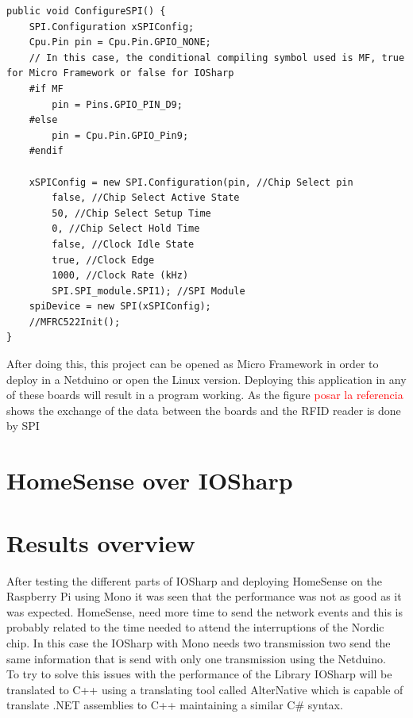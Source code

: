 \begin{lstlisting}[language=CSharp, caption={SPIApi.cs - Conditional compiling symbol for NETMF and IOSharp}]
public void ConfigureSPI() {
    SPI.Configuration xSPIConfig;
    Cpu.Pin pin = Cpu.Pin.GPIO_NONE;
  	// In this case, the conditional compiling symbol used is MF, true for Micro Framework or false for IOSharp
  	#if MF
    	pin = Pins.GPIO_PIN_D9;
    #else
        pin = Cpu.Pin.GPIO_Pin9;
    #endif

    xSPIConfig = new SPI.Configuration(pin, //Chip Select pin
        false, //Chip Select Active State
        50, //Chip Select Setup Time
        0, //Chip Select Hold Time
        false, //Clock Idle State
        true, //Clock Edge
        1000, //Clock Rate (kHz)
        SPI.SPI_module.SPI1); //SPI Module
    spiDevice = new SPI(xSPIConfig);
    //MFRC522Init();
}
\end{lstlisting}

After doing this, this project can be opened as Micro Framework in order to deploy in a Netduino or open the Linux version. Deploying this application in any of these boards will result in a program working. As the figure \textcolor{red}{posar la referencia} shows the exchange of the data between the boards and the RFID reader is done by SPI

\section{HomeSense over IOSharp}\label{S:HomeSense-IOSharp}

\section{Results overview}\label{S:Results-overview}
After testing the different parts of IOSharp and deploying HomeSense on the Raspberry Pi using Mono it was seen that the performance was not as good as it was expected. HomeSense, need more time to send the network events and this is probably related to the time needed to attend the interruptions of the Nordic chip. In this case the IOSharp with Mono needs two transmission two send the same information that is send with only one transmission using the Netduino.
\\
To try to solve this issues with the performance of the Library IOSharp will be translated to C++ using a translating tool called AlterNative which is capable of translate .NET assemblies to C++ maintaining a similar C\# syntax.